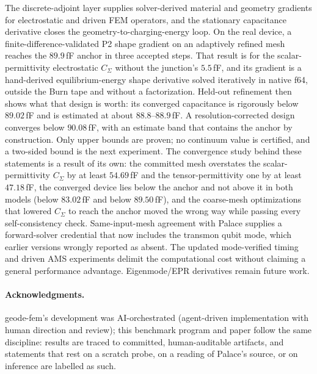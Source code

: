 \documentclass{anvil-paper}
\begin{document}
The discrete-adjoint layer supplies solver-derived material and
geometry gradients for electrostatic and driven FEM operators, and the
stationary capacitance derivative closes the geometry-to-charging-energy
loop. On the real device, a finite-difference-validated P2 shape
gradient on an adaptively refined mesh reaches the $89.9$\,fF anchor in
three accepted steps. That result is for the scalar-permittivity
electrostatic $C_\Sigma$ without the junction's $5.5$\,fF, and its
gradient is a hand-derived equilibrium-energy shape derivative solved
iteratively in native f64, outside the Burn tape and without a
factorization. Held-out refinement then shows what that design
is worth: its converged capacitance is rigorously below $89.02$\,fF and
is estimated at about $88.8$--$88.9$\,fF. A resolution-corrected design
converges below $90.08$\,fF, with an estimate band that contains the
anchor by construction. Only upper bounds are proven; no continuum
value is certified, and a two-sided bound is the next experiment. The
convergence study behind these statements is a result of its own: the
committed mesh overstates the scalar-permittivity $C_\Sigma$ by at
least $54.69$\,fF and the tensor-permittivity one by at least
$47.18$\,fF, the converged device lies below the anchor and not above
it in both models (below $83.02$\,fF and below $89.50$\,fF), and the
coarse-mesh optimizations that lowered $C_\Sigma$ to reach the anchor
moved the wrong way while passing every self-consistency check.
Same-input-mesh agreement with Palace supplies a forward-solver
credential that now includes the transmon qubit mode, which earlier
versions wrongly reported as absent. The updated mode-verified timing
and driven AMS experiments delimit the computational cost without
claiming a general performance advantage. Eigenmode/EPR
derivatives remain future work.

\paragraph{Acknowledgments.}
geode-fem's development was AI-orchestrated (agent-driven implementation
with human direction and review); this benchmark program and paper
follow the same discipline: results are traced to committed,
human-auditable artifacts, and statements that rest on a scratch probe,
on a reading of Palace's source, or on inference are labelled as such.



\end{document}
